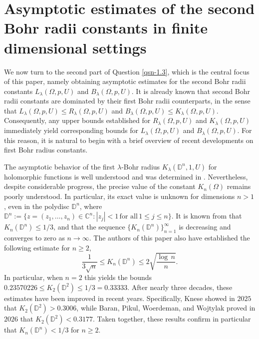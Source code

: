\documentclass[a4paper,11pt, reqno]{amsart}
\theoremstyle{definition}
\newcounter {own}
\begin{document}
\section{Asymptotic estimates of the second Bohr radii constants in finite dimensional settings}
	We now turn to the second part of Question \ref{qsn-1.3}, which is the central focus of this paper, namely obtaining asymptotic estimates for the second Bohr radii constants $L_{\lambda}(\Omega, p,U)$ and $B_{\lambda}(\Omega, p,U)$. It is already known that second Bohr radii constants are dominated by their first Bohr radii counterparts, in the sense that $L_{\lambda}(\Omega, p,U) \leq R_{\lambda}(\Omega, p,U)$ and $B_{\lambda}(\Omega, p,U) \leq K_{\lambda}(\Omega, p,U)$. Consequently, any upper bounds established for $R_{\lambda}(\Omega, p,U)$ and $K_{\lambda}(\Omega, p,U)$ immediately yield corresponding bounds for $L_{\lambda}(\Omega, p,U)$ and $B_{\lambda}(\Omega, p,U)$. For this reason, it is natural to begin with a brief overview of recent developments on first Bohr radius constants.
	\par
	The asymptotic behavior of the first $\lambda$-Bohr radius $K_{\lambda}(\mathbb{D}^n, 1,U)$ for holomorphic functions is well understood and was determined in \cite{defant-2012}. Nevertheless, despite considerable progress, the precise value of the constant $K_{n}(\Omega)$ remains poorly understood. In particular, its exact value is unknown for dimensions $n>1$, even in the polydisc $\mathbb{D}^n$, where $\mathbb{D}^n:=\{z=(z_{1},\ldots,z_{n}) \in \mathbb{C}^n: |z_{j}|<1\, \mbox{for all}\, 1 \leq j \leq n\}$. It is known from \cite{boas-1997} that $K_n(\mathbb{D}^n)\leq 1/3$, and that the sequence $\{K_n(\mathbb{D}^n)\}_{n=1}^{\infty}$ is decreasing and converges to zero as $n \rightarrow \infty$. The authors of this paper also have established the following estimate for $n\geq 2$,
	$$
	\frac{1}{3\sqrt{n}} \leq K_n(\mathbb{D}^n) \leq 2\sqrt{\frac{\log\,n}{n}}.
	$$
	In particular, when	$n=2$
	this yields the bounds $0.23570226\leq K_2(\mathbb{D}^2) \leq 1/3=0.33333$. After nearly three decades, these estimates have been improved in recent years. Specifically, Knese \cite{knese-2025} showed in $2025$ that $K_2(\mathbb{D}^2)>0.3006$, while Baran, Pikul, Woerdeman, and Wojtylak \cite{baran-2026} proved in $2026$ that $K_2(\mathbb{D}^2) < 0.3177$. Taken together, these results confirm in particular that $K_n(\mathbb{D}^n) <1/3$ for $n \geq 2$.
	\vspace{1mm}
	
\end{document}
